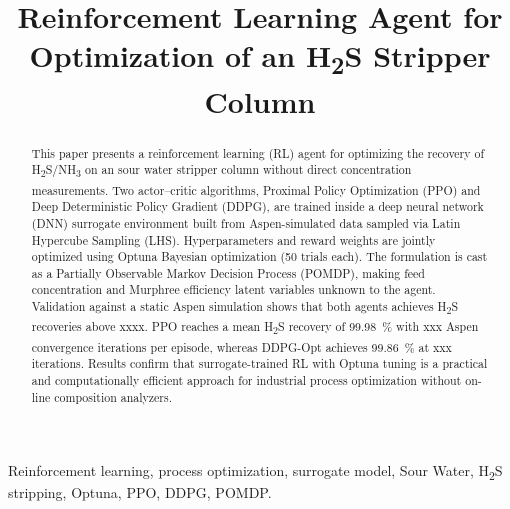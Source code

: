 \documentclass[journal,10pt,twocolumn]{IEEEtran}
\begin{document}
\title{Reinforcement Learning Agent for Optimization of an H\textsubscript{2}S Stripper Column}

\author{%
  \and
  \and
}

\maketitle

\begin{abstract}
This paper presents a reinforcement learning (RL) agent for optimizing the recovery of H\textsubscript{2}S/NH\textsubscript{3} on an sour water stripper column without direct concentration measurements. Two actor–critic algorithms, Proximal Policy Optimization (PPO) and Deep Deterministic Policy Gradient (DDPG), are trained inside a deep neural network (DNN) surrogate environment built from Aspen-simulated data sampled via Latin Hypercube Sampling (LHS). Hyperparameters and reward weights are jointly optimized using Optuna Bayesian optimization (50 trials each). The formulation is cast as a Partially Observable Markov Decision Process (POMDP), making feed concentration and Murphree efficiency latent variables unknown to the agent. Validation against a static Aspen simulation shows that both agents achieves H\textsubscript{2}S recoveries above xxxx. PPO reaches a mean H\textsubscript{2}S recovery of \SI{99.98}{\percent} with xxx Aspen convergence iterations per episode, whereas DDPG-Opt achieves \SI{99.86}{\percent} at xxx iterations. Results confirm that surrogate-trained RL with Optuna tuning is a practical and computationally efficient approach for industrial process optimization without on-line composition analyzers.
\end{abstract}

\begin{IEEEkeywords}
Reinforcement learning, process optimization, surrogate model, Sour Water, H\textsubscript{2}S stripping, Optuna, PPO, DDPG, POMDP.
\end{IEEEkeywords}

\end{document}
